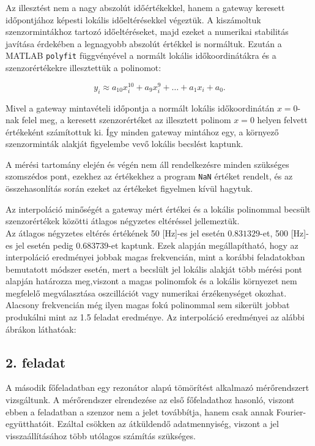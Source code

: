 \documentclass[12pt,a4paper]{article}
\newcommand{\feladat}[1]{%
\phantomsection
\subsection*{#1. feladat}%
\addcontentsline{toc}{subsection}{#1. feladat}%
}
\begin{document}
Az illesztést nem a nagy abszolút időértékekkel, hanem a gateway keresett
időpontjához képesti lokális időeltérésekkel végeztük. A kiszámoltuk
szenzormintákhoz tartozó időeltéréseket, majd ezeket a numerikai stabilitás javítása érdekében a legnagyobb abszolút értékkel is normáltuk. Ezután a MATLAB
\texttt{polyfit} függvényével a normált lokális időkoordinátákra és a
szenzorértékekre illesztettük a polinomot:

\begin{equation}
y_i \approx
a_{10}x_i^{10}+a_9x_i^9+\ldots+a_1x_i+a_0.
\end{equation}

Mivel a gateway mintavételi időpontja a normált lokális időkoordinátán
\(x=0\)-nak felel meg, a keresett szenzorértéket az illesztett polinom
\(x=0\) helyen felvett értékeként számítottuk ki. Így minden gateway
mintához egy, a környező szenzorminták alakját figyelembe vevő lokális
becslést kaptunk.

A mérési tartomány elején és végén nem áll rendelkezésre minden szükséges
szomszédos pont, ezekhez az értékekhez a program \texttt{NaN} értéket rendelt, és az
összehasonlítás során ezeket az értékeket figyelmen kívül hagytuk.

Az interpoláció minőségét a gateway mért értékei és a lokális polinommal
becsült szenzorértékek közötti átlagos négyzetes eltéréssel jellemeztük.\\

Az átlagos négyzetes eltérés értékének 50 [Hz]-es jel esetén $0.831329$-et, 500 [Hz]-es jel esetén pedig $0.683739$-et kaptunk. Ezek alapján megállapítható, hogy az interpoláció eredményei jobbak magas frekvencián, mint a korábbi feladatokban bemutatott módszer esetén, mert a becslült jel lokális alakját több mérési pont alapján határozza meg,viszont a magas polinomfok és a lokális környezet nem megfelelő megválasztása oszcillációt vagy numerikai érzékenységet okozhat. Alacsony frekvencián még ilyen magas fokú polinommal sem sikerült jobbat produkálni mint az 1.5 feladat eredménye. Az interpoláció eredményei az alábbi ábrákon láthatóak:



\newpage

\feladat{2}
A második főfeladatban egy rezonátor alapú tömörítést alkalmazó mérőrendszert vizsgáltunk. A mérőrendszer elrendezése az első főfeladathoz hasonló, viszont ebben a feladatban a szenzor nem a jelet továbbítja, hanem csak annak Fourier-együtthatóit. Ezáltal csökken az átküldendő adatmennyiség, viszont a jel visszaállításához több utólagos számítás szükséges.
\end{document}
